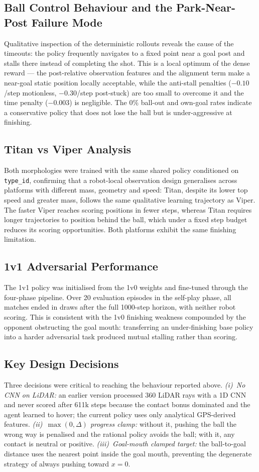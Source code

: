 \documentclass[conference]{IEEEtran}
\begin{document}
\subsection{Ball Control Behaviour and the Park-Near-Post Failure Mode}
Qualitative inspection of the deterministic rollouts reveals the cause of the
timeouts: the policy frequently navigates to a fixed point near a goal post and
stalls there instead of completing the shot. This is a local
optimum of the dense reward — the post-relative observation features and the
alignment term make a near-goal static position locally acceptable, while the
anti-stall penalties ($-0.10$/step motionless, $-0.30$/step post-stuck) are too
small to overcome it and the time penalty ($-0.003$) is negligible. The $0\%$
ball-out and own-goal rates indicate a conservative policy that does not lose the
ball but is under-aggressive at finishing.

\subsection{Titan vs Viper Analysis}
Both morphologies were trained with the same shared policy conditioned on
\texttt{type\_id}, confirming that a robot-local observation design generalises
across platforms with different mass, geometry and speed: Titan, despite its lower
top speed and greater mass, follows the same qualitative learning trajectory as
Viper. The faster Viper reaches scoring positions in fewer steps, whereas Titan
requires longer trajectories to position behind the ball, which under a fixed step
budget reduces its scoring opportunities. Both platforms exhibit the same finishing
limitation.

\subsection{1v1 Adversarial Performance}
The 1v1 policy was initialised from the 1v0 weights and fine-tuned through the
four-phase pipeline. Over 20 evaluation episodes in the self-play phase, all
matches ended in draws after the full 1000-step horizon, with neither robot
scoring. This is consistent with the 1v0 finishing weakness compounded by the
opponent obstructing the goal mouth: transferring an under-finishing base policy
into a harder adversarial task produced mutual stalling rather than scoring.

\subsection{Key Design Decisions}
Three decisions were critical to reaching the behaviour reported above.
\emph{(i)~No CNN on LiDAR:} an earlier version processed 360 LiDAR rays with a 1D
CNN and never scored after 611k steps because the contact bonus dominated and the
agent learned to hover; the current policy uses only analytical GPS-derived
features. \emph{(ii)~$\max(0,\Delta)$ progress clamp:} without it, pushing the ball
the wrong way is penalised and the rational policy avoids the ball; with it, any
contact is neutral or positive. \emph{(iii)~Goal-mouth clamped target:} the
ball-to-goal distance uses the nearest point inside the goal mouth, preventing the
degenerate strategy of always pushing toward $x=0$.
\end{document}
